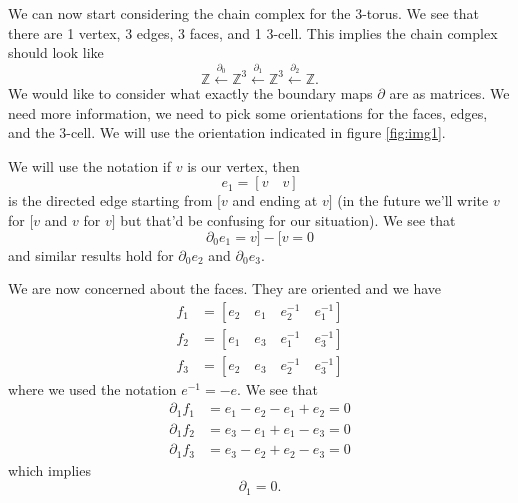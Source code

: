 We can now start considering the chain complex for the
3-torus. We see that there are 1 vertex, 3 edges, 3 faces, and 1
3-cell. This implies the chain complex should look like
\begin{equation}%
\mathbb{Z}\xleftarrow{\partial_{0}}\mathbb{Z}^{3}\xleftarrow{\partial_{1}}\mathbb{Z}^{3}\xleftarrow{\partial_{2}}\mathbb{Z}.
\end{equation}
We would like to consider what exactly the boundary maps
$\partial$ are as matrices. We need more information, we need to
pick some orientations for the faces, edges, and the
3-cell. %
We will use the orientation indicated in figure \ref{fig:img1}. 

We will use the notation if $v$ is our vertex, then
\begin{equation}%
e_{1} = [v \quad v]
\end{equation}
is the directed edge starting from $[v$ and ending at $v]$
(in the future we'll write $v$ for $[v$ and $v$ for $v]$ but that'd
be confusing for our situation). We see that
\begin{equation}%
\partial_{0}e_{1} = v] - [v = 0
\end{equation}
and similar results hold for $\partial_{0}e_{2}$ and
$\partial_{0}e_{3}$.

We are now concerned about the faces. They are oriented and we
have 
\begin{subequations}
\begin{align}
f_{1} &= [e_{2}\quad e_{1}\quad e^{-1}_{2}\quad e^{-1}_{1}]\\
f_{2} &= [e_{1}\quad e_{3}\quad e^{-1}_{1}\quad e^{-1}_{3}]\\
f_{3} &= [e_{2}\quad e_{3}\quad e^{-1}_{2}\quad e^{-1}_{3}]
\end{align}
\end{subequations}
where we used the notation $e^{-1}=-e$. We see that
\begin{subequations}
\begin{align}
\partial_{1}f_{1} &= e_{1}-e_{2}-e_{1}+e_{2} = 0\\
\partial_{1}f_{2} &= e_{3}-e_{1}+e_{1}-e_{3} = 0\\
\partial_{1}f_{3} &= e_{3}-e_{2}+e_{2}-e_{3} = 0
\end{align}
\end{subequations}
which implies
\begin{equation}%
\partial_{1} = 0.
\end{equation}


